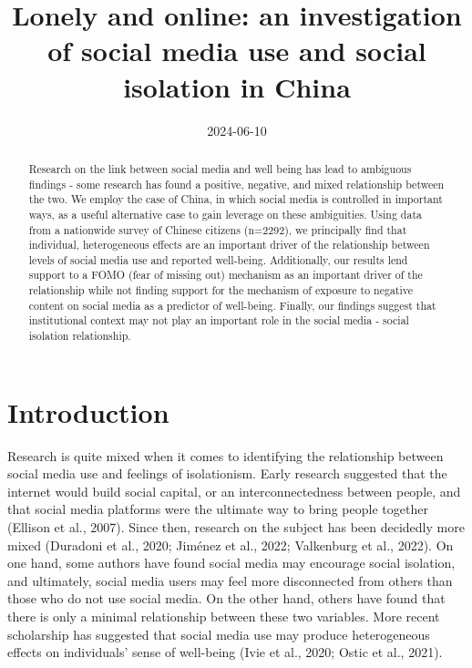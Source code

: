 \documentclass[
  letterpaper,
  DIV=11,
  numbers=noendperiod]{scrartcl}
\title{Lonely and online: an investigation of social media use and
social isolation in China}
\author{}
\date{2024-06-10}
\begin{document}
\maketitle
\begin{abstract}
Research on the link between social media and well being has lead to
ambiguous findings - some research has found a positive, negative, and
mixed relationship between the two. We employ the case of China, in
which social media is controlled in important ways, as a useful
alternative case to gain leverage on these ambiguities. Using data from
a nationwide survey of Chinese citizens (n=2292), we principally find
that individual, heterogeneous effects are an important driver of the
relationship between levels of social media use and reported well-being.
Additionally, our results lend support to a FOMO (fear of missing out)
mechanism as an important driver of the relationship while not finding
support for the mechanism of exposure to negative content on social
media as a predictor of well-being. Finally, our findings suggest that
institutional context may not play an important role in the social media
- social isolation relationship.
\end{abstract}

\newpage{}

\section{Introduction}\label{introduction}

Research is quite mixed when it comes to identifying the relationship
between social media use and feelings of isolationism. Early research
suggested that the internet would build social capital, or an
interconnectedness between people, and that social media platforms were
the ultimate way to bring people together (Ellison et al., 2007). Since
then, research on the subject has been decidedly more mixed (Duradoni et
al., 2020; Jiménez et al., 2022; Valkenburg et al., 2022). On one hand,
some authors have found social media may encourage social isolation, and
ultimately, social media users may feel more disconnected from others
than those who do not use social media. On the other hand, others have
found that there is only a minimal relationship between these two
variables. More recent scholarship has suggested that social media use
may produce heterogeneous effects on individuals' sense of well-being
(Ivie et al., 2020; Ostic et al., 2021).
\end{document}
